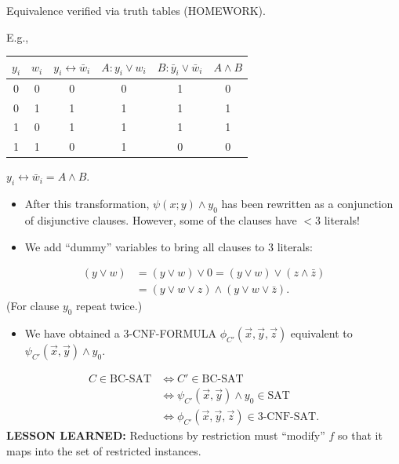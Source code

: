 Equivalence verified via truth tables (HOMEWORK).

E.g.,
\begin{center}
\begin{tabular}{cc|c|c|c|c}
$y_i$&$w_i$&$y_i\leftrightarrow\bar w_i$&$A:y_i\lor w_i$&$B:\bar y_i\lor\bar w_i$&$A\land B$\\\hline
0&0&0&0&1&0\\
0&1&1&1&1&1\\
1&0&1&1&1&1\\
1&1&0&1&0&0
\end{tabular}
\end{center}
$y_i\leftrightarrow\bar w_i=A\land B$.
\begin{itemize}
\item After this transformation, $\psi(x;y)\land y_0$ has been rewritten as a conjunction of disjunctive clauses. However, some of the clauses have $<3$ literals!
\item We add ``dummy'' variables to bring all clauses to 3 literals:
\end{itemize}
\[
\begin{aligned}
(y\lor w)&=(y\lor w)\lor0=(y\lor w)\lor(z\land\bar z)\\
&=(y\lor w\lor z)\land(y\lor w\lor\bar z).
\end{aligned}
\]
(For clause $y_0$ repeat twice.)
\begin{itemize}
\item We have obtained a 3-CNF-FORMULA $\phi_{C'}(\vec x,\vec y,\vec z)$ equivalent to $\psi_{C'}(\vec x,\vec y)\land y_0$.
\end{itemize}
\[
\begin{aligned}
C\in\mathrm{BC\text{-}SAT}&\Longleftrightarrow C'\in\mathrm{BC\text{-}SAT}\\
&\Longleftrightarrow\psi_{C'}(\vec x,\vec y)\land y_0\in\mathrm{SAT}\\
&\Longleftrightarrow\phi_{C'}(\vec x,\vec y,\vec z)\in\mathrm{3\text{-}CNF\text{-}SAT}.
\end{aligned}
\]
\textbf{LESSON LEARNED:} Reductions by restriction must ``modify'' $f$ so that it maps into the set of restricted instances.
